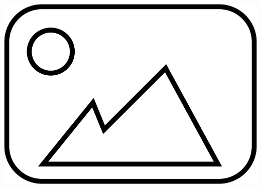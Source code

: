 \documentclass[aspectratio=169,10pt]{beamer}
\begin{document}
\begin{frame}
\begin{columns}[T]
\begin{column}{0.45\textwidth}
            \centering
            \includegraphics[width=\textwidth]{placeholder.png} %
            
        \end{column}
    \end{columns}
\end{frame}
\end{document}
